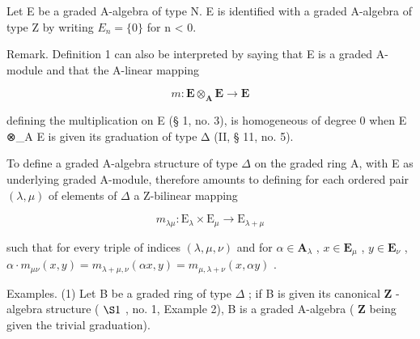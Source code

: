 Let E be a graded A-algebra of type N. E is identified with a graded A-algebra of type Z by writing \(E_{n} = \{0\}\) for n \textless{} 0.

Remark. Definition 1 can also be interpreted by saying that E is a graded A-module and that the A-linear mapping

\[
m \colon \mathbf {E} \otimes_ {\mathbf {A}} \mathbf {E} \rightarrow \mathbf {E}
\]

defining the multiplication on E (§ 1, no. 3), is homogeneous of degree 0 when E ⊗\_A E is given its graduation of type Δ (II, § 11, no. 5).

To define a graded A-algebra structure of type \(\Delta\) on the graded ring A, with E as underlying graded A-module, therefore amounts to defining for each ordered pair \((\lambda, \mu)\) of elements of \(\Delta\) a Z-bilinear mapping

\[
m _ {\lambda \mu}: \mathrm{E} _ {\lambda} \times \mathrm{E} _ {\mu} \rightarrow \mathrm{E} _ {\lambda + \mu}
\]

such that for every triple of indices \((\lambda, \mu, \nu)\) and for \(\alpha \in \mathbf{A}_{\lambda}\) , \(x \in \mathbf{E}_{\mu}\) , \(y \in \mathbf{E}_{\nu}\) , \(\alpha \cdot m_{\mu\nu}(x, y) = m_{\lambda + \mu, \nu}(\alpha x, y) = m_{\mu, \lambda + \nu}(x, \alpha y)\) .

Examples. (1) Let B be a graded ring of type \(\Delta\) ; if B is given its canonical \(\mathbf{Z}\) -algebra structure ( \(\S 1\) , no. 1, Example 2), B is a graded A-algebra ( \(\mathbf{Z}\) being given the trivial graduation).


